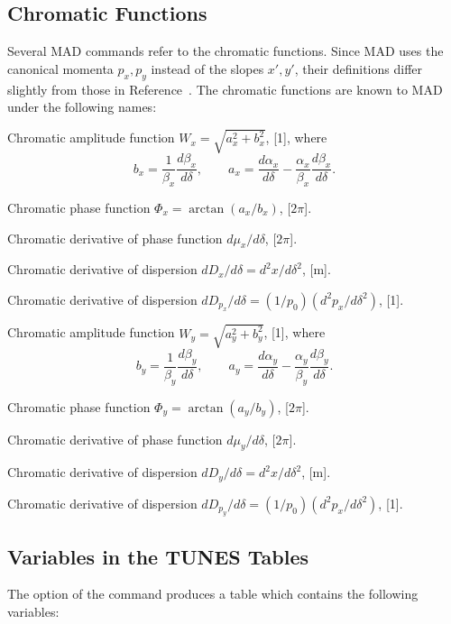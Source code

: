 \subsection{Chromatic Functions}
\label{S-CHROM}
Several MAD commands refer to the chromatic functions.
Since MAD uses the canonical momenta \(p_{x}, p_{y}\)
instead of the slopes \(x', y'\),
their definitions differ slightly from those
in Reference~\cite{B-MON79}.
The chromatic functions are known to MAD under the following names:
 
\begin{mylist}
Chromatic amplitude function
\(W_{x}=\sqrt{a_{x}^{2}+b_{x}^{2}}\), [1], where
\[
   b_{x}=\frac{1}{\beta_{x}}\frac{d\beta_{x}}{d\delta},
   \qquad
   a_{x}=\frac{d\alpha_{x}}{d\delta}
        -\frac{\alpha_{x}}{\beta_{x}}\frac{d\beta_{x}}{d\delta}.
\]
 
Chromatic phase function
\(\Phi_{x}=\arctan(a_{x}/b_{x})\), [\(2\pi\)].
 
Chromatic derivative of phase function
\(d\mu_{x}/d\delta\), [\(2\pi\)].
 
Chromatic derivative of dispersion
\(dD_{x}/d\delta=d^{2}x/d\delta^{2}\), [m].
 
Chromatic derivative of dispersion
\(dD_{p_{x}}/d\delta=(1/p_{0})(d^{2}p_{x}/d\delta^{2})\), [1].
 
Chromatic amplitude function
\(W_{y}=\sqrt{a_{y}^{2}+b_{y}^{2}}\), [1], where
\[
   b_{y}=\frac{1}{\beta_{y}}\frac{d\beta_{y}}{d\delta},
   \qquad
   a_{y}=\frac{d\alpha_{y}}{d\delta}
      -\frac{\alpha_{y}}{\beta_{y}}\frac{d\beta_{y}}{d\delta}.
\]
 
Chromatic phase function
\(\Phi_{y}=\arctan(a_{y}/b_{y})\), [\(2\pi\)].
 
Chromatic derivative of phase function
\(d\mu_{y}/d\delta\), [\(2\pi\)].
 
Chromatic derivative of dispersion
\(dD_{y}/d\delta=d^{2}x/d\delta^{2}\), [m].
 
Chromatic derivative of dispersion
\(dD_{p_{y}}/d\delta=(1/p_{0})(d^{2}p_{x}/d\delta^{2})\), [1].
\end{mylist}
 
\subsection{Variables in the TUNES Tables}
\label{S-TUNES}
The  option of the  command produces a table
which contains the following variables:
 
